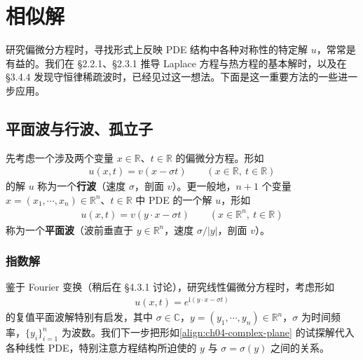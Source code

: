 \documentclass[../../main.tex]{subfiles}
\begin{document}
\section{相似解}\label{section:ch04-similarity}

研究偏微分方程时，寻找形式上反映 PDE 结构中各种对称性的特定解 $u$，常常是有益的。我们在 \S2.2.1、\S2.3.1 推导 Laplace 方程与热方程的基本解时，以及在 \S3.4.4 发现守恒律稀疏波时，已经见过这一想法。下面是这一重要方法的一些进一步应用。

\subsection{平面波与行波、孤立子}\label{subsection:ch04-plane-wave}

先考虑一个涉及两个变量 $x\in\mathbb{R}$、$t\in\mathbb{R}$ 的偏微分方程。形如
\begin{align}\label{align:ch04-traveling}
u(x,t)=v(x-\sigma t) \qquad(x\in\mathbb{R},\ t\in\mathbb{R})
\end{align}
的解 $u$ 称为一个\textbf{行波}（速度 $\sigma$，剖面 $v$）。更一般地，$n+1$ 个变量 $x=(x_1,\cdots,x_n)\in\mathbb{R}^n$、$t\in\mathbb{R}$ 中 PDE 的一个解 $u$，形如
\begin{align}\label{align:ch04-plane}
u(x,t)=v(y\cdot x-\sigma t) \qquad(x\in\mathbb{R}^n,\ t\in\mathbb{R})
\end{align}
称为一个\textbf{平面波}（波前垂直于 $y\in\mathbb{R}^n$，速度 $\sigma/|y|$，剖面 $v$）。

\subsubsection{指数解}

鉴于 Fourier 变换（稍后在 \S4.3.1 讨论），研究线性偏微分方程时，考虑形如
\begin{align}\label{align:ch04-complex-plane}
u(x,t)=e^{\mathrm{i}(y\cdot x-\sigma t)}
\end{align}
的复值平面波解特别有启发，其中 $\sigma\in\mathbb{C}$，$y=(y_1,\cdots,y_n)\in\mathbb{R}^n$，$\sigma$ 为时间频率，$\{y_i\}_{i=1}^n$ 为波数。我们下一步把形如\eqref{align:ch04-complex-plane} 的试探解代入各种线性 PDE，特别注意方程结构所迫使的 $y$ 与 $\sigma=\sigma(y)$ 之间的关系。
\end{document}
